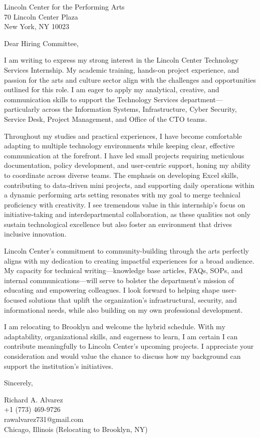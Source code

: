 \documentclass[a4paper,10pt]{letter}
\begin{document}
\begin{letter}{
Lincoln Center for the Performing Arts \\
70 Lincoln Center Plaza \\
New York, NY 10023
}

\opening{Dear Hiring Committee,}

I am writing to express my strong interest in the Lincoln Center Technology Services Internship. My academic training, hands-on project experience, and passion for the arts and culture sector align with the challenges and opportunities outlined for this role. I am eager to apply my analytical, creative, and communication skills to support the Technology Services department—particularly across the Information Systems, Infrastructure, Cyber Security, Service Desk, Project Management, and Office of the CTO teams.

Throughout my studies and practical experiences, I have become comfortable adapting to multiple technology environments while keeping clear, effective communication at the forefront. I have led small projects requiring meticulous documentation, policy development, and user-centric support, honing my ability to coordinate across diverse teams. The emphasis on developing Excel skills, contributing to data-driven mini projects, and supporting daily operations within a dynamic performing arts setting resonates with my goal to merge technical proficiency with creativity. I see tremendous value in this internship’s focus on initiative-taking and interdepartmental collaboration, as these qualities not only sustain technological excellence but also foster an environment that drives inclusive innovation.

Lincoln Center’s commitment to community-building through the arts perfectly aligns with my dedication to creating impactful experiences for a broad audience. My capacity for technical writing—knowledge base articles, FAQs, SOPs, and internal communications—will serve to bolster the department’s mission of educating and empowering colleagues. I look forward to helping shape user-focused solutions that uplift the organization’s infrastructural, security, and informational needs, while also building on my own professional development.

I am relocating to Brooklyn and welcome the hybrid schedule. With my adaptability, organizational skills, and eagerness to learn, I am certain I can contribute meaningfully to Lincoln Center’s upcoming projects. I appreciate your consideration and would value the chance to discuss how my background can support the institution’s initiatives.

\closing{Sincerely,}

\vspace{1em}

Richard A. Alvarez \\
+1 (773) 469-9726 \\
rawalvarez731@gmail.com \\
Chicago, Illinois (Relocating to Brooklyn, NY)

\end{letter}
\end{document}
